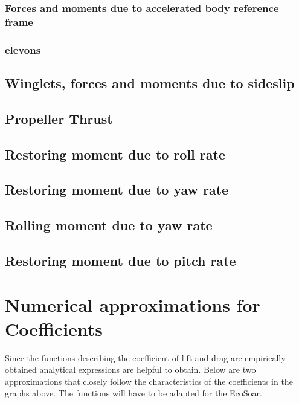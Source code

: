 \documentclass{article}
\begin{document}






\subsubsection{Forces and moments due to accelerated body reference frame}



\subsubsection{elevons}


\subsection{Winglets, forces and moments due to sideslip}


\subsection{Propeller Thrust}


\subsection{Restoring moment due to roll rate}


\subsection{Restoring moment due to yaw rate}


\subsection{Rolling moment due to yaw rate}


\subsection{Restoring moment due to pitch rate}








\section{Numerical approximations for Coefficients}
Since the functions describing the coefficient of lift and drag are empirically obtained analytical expressions are helpful to obtain.
Below are two approximations that closely follow the characteristics of the coefficients in the graphs above.
The functions will have to be adapted for the EcoSoar.
\end{document}
